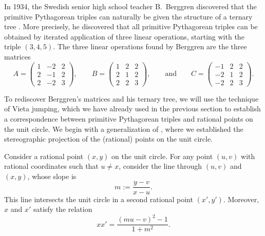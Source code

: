 In 1934, the Swedish senior high school teacher B.~Berggren discovered that the primitive Pythagorean triples can naturally be given the structure of a ternary tree \cite{berggren1934}. More precisely, he discovered that all primitive Pythagorean triples can be obtained by iterated application of three linear operations, starting with the triple $(3,4,5)$. The three linear operations found by Berggren are the three matrices
\begin{equation*}
  A =
  \left(
    \begin{matrix}
      1 & -2 & 2 \\
      2 & -1 & 2 \\
      2 & -2 & 3
    \end{matrix}
  \right),\qquad
  B =
  \left(
    \begin{matrix}
      1 & 2 & 2 \\
      2 & 1 & 2 \\
      2 & 2 & 3
    \end{matrix}
  \right),\qquad\text{and}\qquad
  C =
  \left(
    \begin{matrix}
      -1 & 2 & 2 \\
      -2 & 1 & 2 \\
      -2 & 2 & 3
    \end{matrix}
  \right).
\end{equation*}

To rediscover Berggren's matrices and his ternary tree, we will use the technique of Vieta jumping, which we have already used in the previous section to establish a correspondence between primitive Pythagorean triples and rational points on the unit circle. We begin with a generalization of , where we established the stereographic projection of the (rational) points on the unit circle.

\begin{theorem}\label{theorem:vieta-jumping-rational-points-unit-circle}
  Consider a rational point $(x,y)$ on the unit circle. For any point $(u,v)$ with rational coordinates such that $u\neq x$, consider the line through $(u,v)$ and $(x,y)$, whose slope is
  \begin{equation*}
    m:=\frac{y-v}{x-u}.
  \end{equation*}
  This line intersects the unit circle in a second rational point $(x',y')$. Moreover, $x$ and $x'$ satisfy the relation
  \begin{equation*}
    xx' = \frac{(mu-v)^2 -1}{1+m^2}.
  \end{equation*}
\end{theorem}

